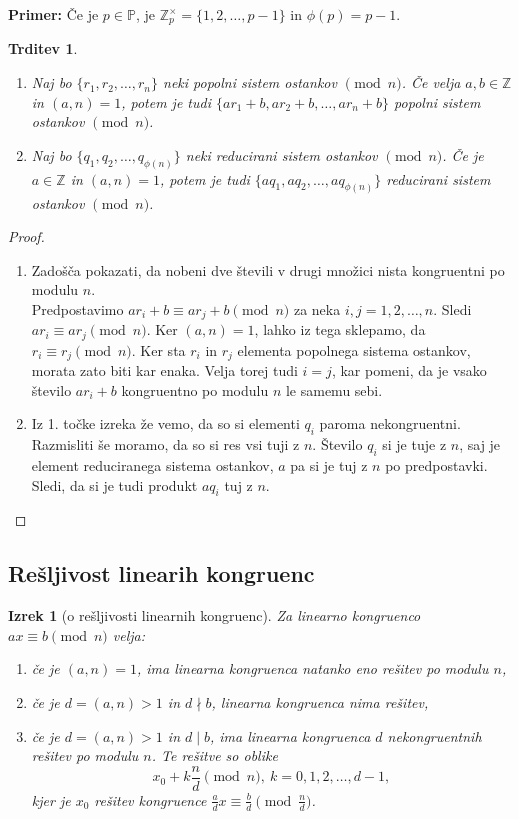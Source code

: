 \documentclass[12pt, a4paper]{article}
\newtheorem{trd}{Trditev}
\newtheorem{izr}{Izrek}
\newenvironment{prim}[1][]{\par\medskip\noindent \textbf{Primer: }}{\medskip}
\begin{document}
\begin{prim}
Če je $p\in \mathbb{P}$, je $\mathbb{Z}_{p}^{\times}=\{1,2,\ldots,p-1\}$ in $\phi(p)=p-1$.
\end{prim}

\begin{trd}
\label{rsistem}
\begin{enumerate}
\item Naj bo $\{r_{1},r_{2},\ldots,r_{n}\}$ neki popolni sistem ostankov $\pmod n$. Če velja $a,b\in \mathbb{Z}$ in $(a,n)=1$, potem je tudi $\{ar_{1}+b,ar_{2}+b,\ldots,ar_{n}+b\}$ popolni sistem ostankov $\pmod n$.
\item Naj bo $\{q_{1},q_{2},\ldots,q_{\phi(n)}\}$ neki reducirani sistem ostankov $\pmod n$. Če je $a\in \mathbb{Z}$ in $(a,n)=1$, potem je tudi $\{aq_{1},aq_{2},\ldots,aq_{\phi(n)}\}$ reducirani sistem ostankov $\pmod n$.
\end{enumerate}
\end{trd}

\begin{proof}
\begin{enumerate}
\item Zadošča pokazati, da nobeni dve števili v drugi množici nista kongruentni po modulu $n$.\\
Predpostavimo $ar_{i}+b\equiv ar_{j}+b \pmod n$ za neka $i,j =1,2,\ldots,n$. Sledi  $ar_{i}\equiv ar_{j} \pmod n$. Ker $(a,n)=1$, lahko iz tega sklepamo, da $r_{i} \equiv r_{j} \pmod n$. Ker sta $r_{i}$ in $r_{j}$ elementa popolnega sistema ostankov, morata zato biti kar enaka. Velja torej tudi $i=j$, kar pomeni, da je vsako število $ar_{i}+b$ kongruentno po modulu $n$ le samemu sebi.
\item Iz 1. točke izreka že vemo, da so si elementi $q_{i}$ paroma nekongruentni. Razmisliti še moramo, da so si res vsi tuji z $n$. Število $q_{i}$ si je tuje z $n$, saj je element reduciranega sistema ostankov, $a$ pa si je tuj z $n$ po predpostavki. Sledi, da si je tudi produkt $aq_{i}$ tuj z $n$.
\end{enumerate}
\end{proof}

\subsection{Rešljivost linearih kongruenc}

\begin{izr}[o rešljivosti linearnih kongruenc]
Za linearno kongruenco $ax\equiv b \pmod n$ velja:
\begin{enumerate}
\item če je $(a,n)=1$, ima linearna kongruenca natanko eno rešitev po modulu $n$,
\item če je $d=(a,n)>1$ in $d\nmid b$, linearna kongruenca nima rešitev,
\item če je $d=(a,n)>1$ in $d\mid b$, ima linearna kongruenca $d$ nekongruentnih rešitev po modulu $n$. Te rešitve so oblike
$$x_{0}+k\frac{n}{d} \pmod n,\ k=0,1,2,\ldots,d-1,$$
kjer je $x_{0}$ rešitev kongruence $\frac{a}{d}x\equiv \frac{b}{d} \pmod{\frac{n}{d}}$.
\end{enumerate}
\end{izr}
\end{document}
